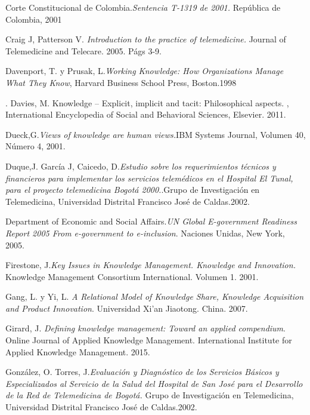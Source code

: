 \begin{thebibliography}{}
 Corte Constitucional de Colombia.\textit{Sentencia T-1319 de 2001.} República de Colombia, 2001

 Craig J, Patterson V. \textit{Introduction to the practice of telemedicine.} Journal of Telemedicine and Telecare. 2005. Págs 3-9.

\bibitem[Currie y otros,2014 {currie2014} Currie W. y Seddon J. A cross-national analysis of eHealth in the European Union: some policy and research directions. Inf Manage. 2014.

\bibitem[Davenport,1998] {davenport1998} Davenport, T. y Prusak, L.\textit{Working Knowledge: How Organizations Manage What They Know}, Harvard Business School Press, Boston.1998

. Davies, M. Knowledge – Explicit, implicit and tacit: Philosophical aspects. , International Encyclopedia of Social and Behavioral Sciences, Elsevier. 2011.

 Dueck,G.\textit{Views of knowledge are human views.}IBM Systems Journal, Volumen 40, Número 4, 2001.

 Duque,J. García J, Caicedo, D.\textit{Estudio sobre los requerimientos técnicos y financieros para implementar los servicios telemédicos en el Hospital El Tunal,  para el proyecto telemedicina Bogotá 2000.}.Grupo de Investigación en Telemedicina,  Universidad Distrital Francisco José de Caldas.2002.

 Department of Economic and Social Affairs.\textit{UN Global E-government Readiness Report 2005 From e-government to e-inclusion}. Naciones Unidas, New York, 2005.

 Firestone, J.\textit{Key Issues in Knowledge Management. Knowledge and Innovation.} Knowledge Management Consortium International. Volumen 1. 2001.

 Gang, L. y Yi, L. \textit{A Relational Model of Knowledge Share, Knowledge Acquisition and Product Innovation}. Universidad Xi'an Jiaotong. China. 2007.

 Girard, J. \textit{Defining knowledge management: Toward an applied compendium}. Online Journal of Applied Knowledge Management. International Institute for Applied Knowledge Management. 2015.

 González, O. Torres, J.\textit{Evaluación y Diagnóstico de los Servicios Básicos y Especializados al Servicio de la Salud del Hospital de San José para el Desarrollo de la Red de Telemedicina de Bogotá.} Grupo de Investigación en Telemedicina, Universidad Distrital Francisco José de Caldas.2002.


\end{thebibliography}
